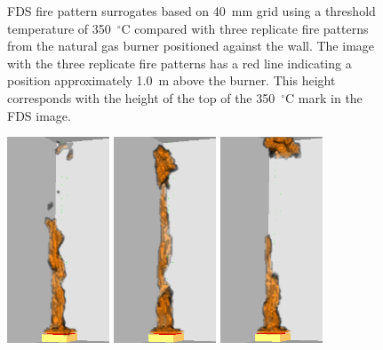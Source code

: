 \documentclass[twoside]{uocthesis}
\begin{document}
\begin{figure}[h]
  \caption[FDS fire pattern surrogates based on 40~mm grid using a threshold temperature of 350~$^\circ$C compared with three replicate fire patterns from the natural gas burner positioned against the wall]{FDS fire pattern surrogates based on 40~mm grid using a threshold temperature of 350~$^\circ$C compared with three replicate fire patterns from the natural gas burner positioned against the wall.  The image with the three replicate fire patterns has a red line indicating a position approximately 1.0~m above the burner.  This height corresponds with the height of the top of the 350~$^\circ$C mark in the FDS image.}
  \label{FDS_FirePattern_comp}
\end{figure}


\begin{figure}[p]
	\includegraphics[width=1.2in]{../Figures/FDSNG_Corner1}
	\includegraphics[width=1.2in]{../Figures/FDSNG_Corner2}
	\includegraphics[width=1.2in]{../Figures/FDSNG_Corner3} \\


\end{figure}
\end{document}
